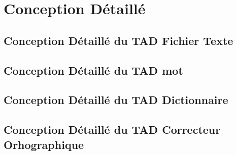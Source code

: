 \section{Conception Détaillé}
	\subsection{Conception Détaillé du TAD Fichier Texte}
		
		
	\subsection{Conception Détaillé du TAD mot}
		
		
	\subsection{Conception Détaillé du TAD Dictionnaire}
		
	\newpage
	\subsection{Conception Détaillé du TAD Correcteur Orhographique}
		
		
